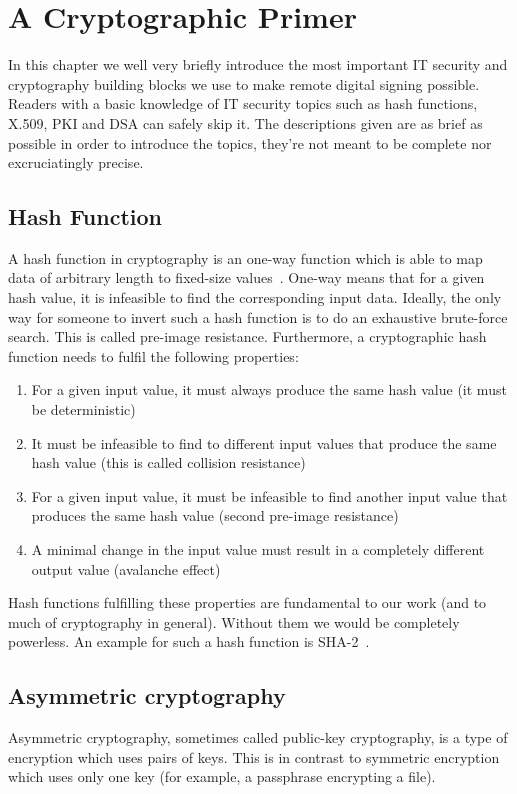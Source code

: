 \chapter{A Cryptographic Primer}\label{ch:a-cryptographic-primer}
In this chapter we well very briefly introduce the most important IT security and cryptography building blocks we use to make remote digital signing possible.
Readers with a basic knowledge of IT security topics such as hash functions, X.509, \gls{PKI} and \gls{DSA} can safely skip it.
The descriptions given are as brief as possible in order to introduce the topics, they're not meant to be complete nor excruciatingly precise.

\section{Hash Function}\label{sec:hash-function}
A hash function in cryptography is an one-way function which is able to map data of arbitrary length to fixed-size values~\cite{hashing}.
One-way means that for a given hash value, it is infeasible to find the corresponding input data.
Ideally, the only way for someone to invert such a hash function is to do an exhaustive brute-force search.
This is called pre-image resistance.
Furthermore, a cryptographic hash function needs to fulfil the following properties:
\begin{enumerate}
    \item For a given input value, it must always produce the same hash value (it must be deterministic)
    \item It must be infeasible to find to different input values that produce the same hash value (this is called collision resistance)
    \item For a given input value, it must be infeasible to find another input value that produces the same hash value (second pre-image resistance)
    \item A minimal change in the input value must result in a completely different output value (avalanche effect)
\end{enumerate}

Hash functions fulfilling these properties are fundamental to our work (and to much of cryptography in general).
Without them we would be completely powerless.
An example for such a hash function is \gls{SHA-2}~\cite{sha2patent}.

\section{Asymmetric cryptography}\label{sec:asymmetric-cryptography}
Asymmetric cryptography, sometimes called public-key cryptography, is a type of encryption which uses pairs of keys.
This is in contrast to symmetric encryption which uses only one key (for example, a passphrase encrypting a file).

